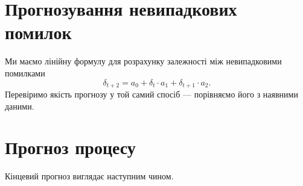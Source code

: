 \section{Прогнозування невипадкових помилок}
Ми маємо лінійну формулу для розрахунку залежності
між невипадковими помилками
\begin{equation*}
  \delta_{t + 2} = a_0 + \delta_{t} \cdot a_1 + \delta_{t + 1} \cdot  a_2.
\end{equation*}
Перевіримо якість прогнозу у той самий спосіб ---
порівняємо його з наявними даними.

\begin{center}
\end{center}

\section{Прогноз процесу}
Кінцевий прогноз виглядає наступним чином.
\begin{center}
\end{center}
